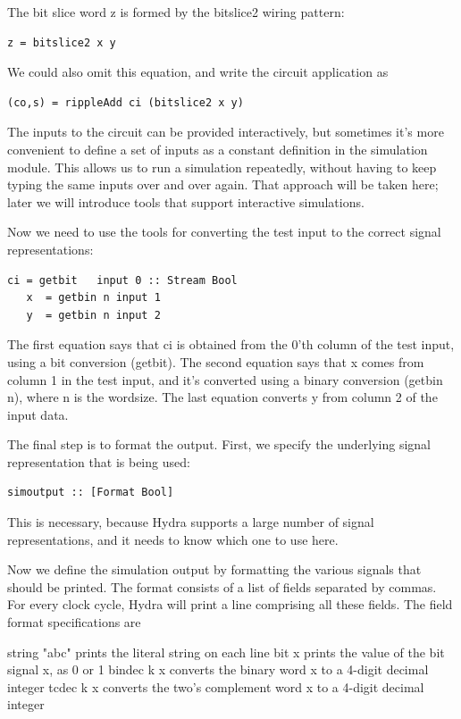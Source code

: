 \documentclass[a4paper,openany,fleqn]{book}
\begin{document}
The bit slice word z is formed by the bitslice2 wiring pattern:
\begin{verbatim}
z = bitslice2 x y
\end{verbatim}
We could also omit this equation, and write the circuit application as
\begin{verbatim}
(co,s) = rippleAdd ci (bitslice2 x y)
\end{verbatim}

The inputs to the circuit can be provided interactively, but sometimes
it's more convenient to define a set of inputs as a constant
definition in the simulation module.  This allows us to run a
simulation repeatedly, without having to keep typing the same inputs
over and over again.  That approach will be taken here; later we will
introduce tools that support interactive simulations.

Now we need to use the tools for converting the test input to the
correct signal representations:

\begin{verbatim}
ci = getbit   input 0 :: Stream Bool 
   x  = getbin n input 1
   y  = getbin n input 2
\end{verbatim}

The first equation says that ci is obtained from the 0'th column of
the test input, using a bit conversion (getbit).  The second equation
says that x comes from column 1 in the test input, and it's converted
using a binary conversion (getbin n), where n is the wordsize.  The
last equation converts y from column 2 of the input data.

The final step is to format the output.  First, we specify the
underlying signal representation that is being used:

\begin{verbatim}
simoutput :: [Format Bool]
\end{verbatim}

This is necessary, because Hydra supports a large number of signal
representations, and it needs to know which one to use here.

Now we define the simulation output by formatting the various signals
that should be printed.  The format consists of a list of fields
separated by commas.  For every clock cycle, Hydra will print a line
comprising all these fields.  The field format specifications are

  string "abc"  prints the literal string on each line
  bit x         prints the value of the bit signal x, as 0 or 1
  bindec k x    converts the binary word x to a 4-digit decimal integer
  tcdec k x     converts the two's complement word x to a 4-digit
                decimal integer
\end{document}
